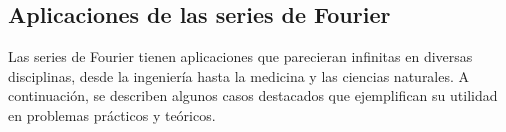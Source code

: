 %

\subsection{Aplicaciones de las series de Fourier }
Las series de Fourier tienen aplicaciones que parecieran infinitas en diversas disciplinas, desde la ingeniería hasta la medicina y las ciencias naturales. A continuación, se describen algunos casos destacados que ejemplifican su utilidad en problemas prácticos y teóricos.
